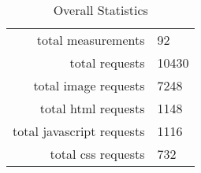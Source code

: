 \begin{table}[h]
\caption{Overall Statistics}\centering
\begin{tabular}{rl}
total measurements & 92\\
total requests & 10430\\
total image requests & 7248\\
total html requests & 1148\\
total javascript requests & 1116\\
total css requests & 732\\
\end{tabular}
\end{table}
